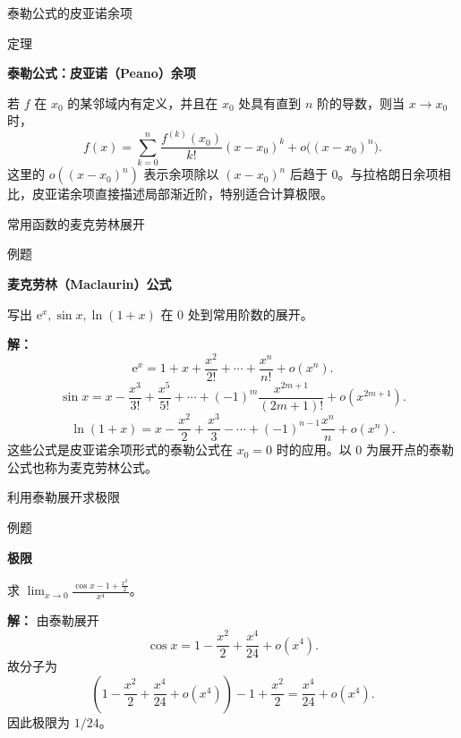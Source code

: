 \documentclass[aspectratio=169,10pt,fontset=fandol]{ctexbeamer}
\newcommand{\ee}{\mathrm{e}}
\begin{document}
\begin{frame}[t,fragile]{泰勒公式的皮亚诺余项}
\normalsize
\begin{block}{定理}
{\normalsize
\textbf{泰勒公式：皮亚诺（Peano）余项}\par

若 \(f\) 在 \(x_0\) 的某邻域内有定义，并且在 \(x_0\) 处具有直到 \(n\) 阶的导数，则当 \(x\to x_0\) 时，
\[
f(x)=\sum_{k=0}^{n}\frac{f^{(k)}(x_0)}{k!}(x-x_0)^k
+o\bigl((x-x_0)^n\bigr).
\]
这里的 \(o((x-x_0)^n)\) 表示余项除以 \((x-x_0)^n\) 后趋于 \(0\)。与拉格朗日余项相比，皮亚诺余项直接描述局部渐近阶，特别适合计算极限。

}
\end{block}
\end{frame}
\begin{frame}[t,fragile]{常用函数的麦克劳林展开}
\normalsize
\begin{block}{例题}
{\normalsize
\textbf{麦克劳林（Maclaurin）公式}\par

写出 $\ee^x,\sin x,\ln(1+x)$ 在 $0$ 处到常用阶数的展开。

}
\end{block}
\pause
{\normalsize
\textbf{解：}
\[
\ee^x=1+x+\frac{x^2}{2!}+\cdots+\frac{x^n}{n!}+o(x^n).
\]
\[
\sin x=x-\frac{x^3}{3!}+\frac{x^5}{5!}+\cdots+(-1)^m\frac{x^{2m+1}}{(2m+1)!}+o(x^{2m+1}).
\]
\[
\ln(1+x)=x-\frac{x^2}{2}+\frac{x^3}{3}-\cdots+(-1)^{n-1}\frac{x^n}{n}+o(x^n).
\]
这些公式是皮亚诺余项形式的泰勒公式在 \(x_0=0\) 时的应用。以 \(0\) 为展开点的泰勒公式也称为麦克劳林公式。

}
\end{frame}
\begin{frame}[t,fragile]{利用泰勒展开求极限}
\normalsize
\begin{block}{例题}
{\normalsize
\textbf{极限}\par

求 $\displaystyle\lim_{x\to0}\frac{\cos x-1+\frac{x^2}{2}}{x^4}$。

}
\end{block}
\pause
{\normalsize
\textbf{解：}
由泰勒展开
\[
\cos x=1-\frac{x^2}{2}+\frac{x^4}{24}+o(x^4).
\]
故分子为
\[
\left(1-\frac{x^2}{2}+\frac{x^4}{24}+o(x^4)\right)-1+\frac{x^2}{2}
=\frac{x^4}{24}+o(x^4).
\]
因此极限为 $1/24$。

}
\end{frame}
\end{document}
